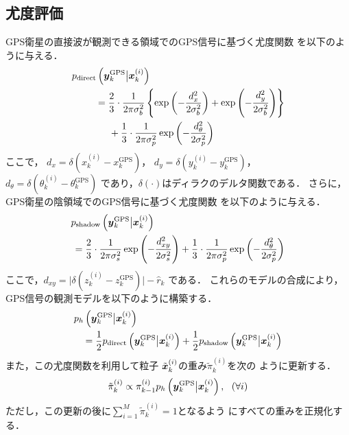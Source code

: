 \documentclass[a4paper,10pt,twocolumn,fleqn]{jsarticle}
\def\vec#1{\mbox{\boldmath$#1$}}
\def\vec#1{\mbox{\boldmath$#1$}}
\begin{document}
\subsection{尤度評価}
\vspace{-2mm}
GPS衛星の直接波が観測できる領域でのGPS信号に基づく尤度関数
を以下のように与える．
\begin{align*}
 p_{\text{direct}}\left( \vec{y}^{\text{GPS}}_k
 \big\vert\vec{x}^{(i)}_k \right)&\nonumber\\
 & \hspace{-20mm}=
 \frac{2}{3}\cdot\frac{1}{2\pi\sigma_b^2}\left\{
 \exp\left(
 -\frac{d^2_x}{2\sigma_b^2}\right)
 +\exp\left(
 -\frac{d^2_y}{2\sigma_b^2}\right)\right\}\nonumber\\
 & \hspace{-15mm} +
 \frac{1}{3}\cdot\frac{1}{2\pi\sigma_p^2}\exp\left(
 -\frac{d_\theta^2}{2\sigma_p^2}\right)
\end{align*}
ここで，
$d_x=\delta\left( x_k^{(i)}-x^{\text{GPS}}_k\right)$，
$d_y=\delta\left( y_k^{(i)}-y^{\text{GPS}}_k\right)$，
$d_\theta =\delta\left(\theta_k^{(i)}-\theta^{\text{GPS}}_k \right)$
であり，$\delta(\cdot)$はディラクのデルタ関数である．
さらに，GPS衛星の陰領域でのGPS信号に基づく尤度関数
を以下のように与える．
\begin{align*}
  p_{\text{shadow}}
 \left(\vec{y}^{\text{GPS}}_k\big \vert\vec{x}^{(i)}_k \right)&\nonumber\\
 & \hspace{-30mm}=
 \frac{2}{3}\cdot\frac{1}{2\pi\sigma_s^2}\exp\left(
 -\frac{d_{xy}^2}{2\sigma_s^2}\right)
 +
 \frac{1}{3}\cdot\frac{1}{2\pi\sigma_p^2}\exp\left(
 -\frac{d_\theta^2}{2\sigma_p^2}\right)
\end{align*}
ここで，$
 d_{xy}=\vert \delta(z_k^{(i)}-z^{\text{GPS}}_k) \vert -\hat{r}_k$
である．
これらのモデルの合成により，GPS信号の観測モデルを以下のように構築する．
\begin{align*}
 p_h\left(
 \vec{y}^{\text{GPS}}_k \big \vert \vec{x}^{(i)}_k \right)&\nonumber\\
&\hspace{-20mm}=
 \frac{1}{2}
 p_{\text{direct}}\left( \vec{y}^{\text{GPS}}_k \big \vert \vec{x}^{(i)}_k\right)+
\frac{1}{2}
 p_{\text{shadow}}\left( \vec{y}^{\text{GPS}}_k \big \vert\vec{x}^{(i)}_k\right)
\end{align*}
また，この尤度関数を利用して粒子
$\tilde{\vec{x}}_{k}^{(i)}$の重み$\tilde{\pi}^{(i)}_{k}$を次の
ように更新する．
 \begin{align}
 \tilde{\pi}^{(i)}_{k} \propto
   \pi^{(i)}_{k-1}   p_h
 \left(\vec{y}^{\text{GPS}}_k \big \vert\vec{x}^{(i)}_k \right), \ \
  \left(\forall i \right)
\end{align}
ただし，この更新の後に$\sum_{i=1}^{M}\tilde{\pi}^{(i)}_{k}=1$となるよう
にすべての重みを正規化する．
\end{document}
